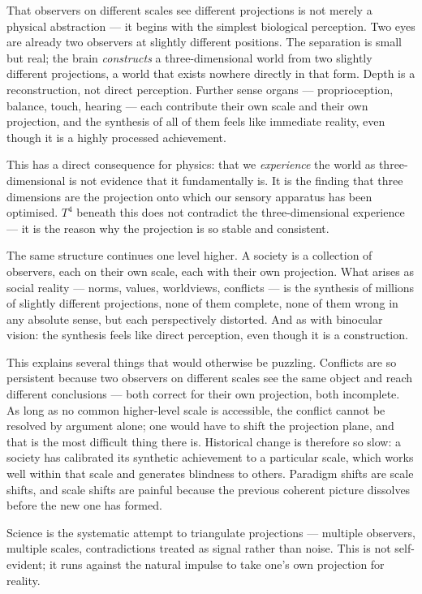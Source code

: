 That observers on different scales see different projections is not merely a
physical abstraction --- it begins with the simplest biological perception.
Two eyes are already two observers at slightly different positions. The
separation is small but real; the brain \emph{constructs} a three-dimensional
world from two slightly different projections, a world that exists nowhere
directly in that form. Depth is a reconstruction, not direct perception.
Further sense organs --- proprioception, balance, touch, hearing --- each
contribute their own scale and their own projection, and the synthesis of all
of them feels like immediate reality, even though it is a highly processed
achievement.

This has a direct consequence for physics: that we \emph{experience} the
world as three-dimensional is not evidence that it fundamentally is. It is the
finding that three dimensions are the projection onto which our sensory
apparatus has been optimised. $T^4$ beneath this does not contradict the
three-dimensional experience --- it is the reason why the projection is so
stable and consistent.

The same structure continues one level higher. A society is a collection of
observers, each on their own scale, each with their own projection. What
arises as social reality --- norms, values, worldviews, conflicts --- is the
synthesis of millions of slightly different projections, none of them
complete, none of them wrong in any absolute sense, but each perspectively
distorted. And as with binocular vision: the synthesis feels like direct
perception, even though it is a construction.

This explains several things that would otherwise be puzzling. Conflicts are
so persistent because two observers on different scales see the same object
and reach different conclusions --- both correct for their own projection,
both incomplete. As long as no common higher-level scale is accessible, the
conflict cannot be resolved by argument alone; one would have to shift the
projection plane, and that is the most difficult thing there is. Historical
change is therefore so slow: a society has calibrated its synthetic
achievement to a particular scale, which works well within that scale and
generates blindness to others. Paradigm shifts are scale shifts, and scale
shifts are painful because the previous coherent picture dissolves before the
new one has formed.

Science is the systematic attempt to triangulate projections --- multiple
observers, multiple scales, contradictions treated as signal rather than
noise. This is not self-evident; it runs against the natural impulse to take
one's own projection for reality.

